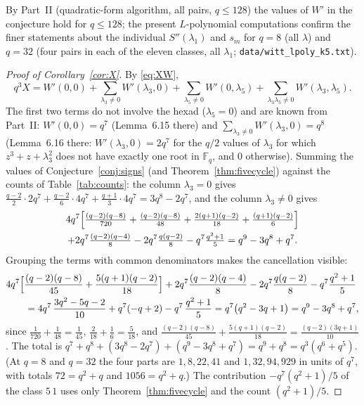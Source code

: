 ﻿\documentclass[12pt,a4paper]{amsart}
\theoremstyle{definition}
\newcommand{\F}{\mathbb{F}}
\newcommand{\Spp}{S''}
\begin{document}
By Part~II (quadratic-form algorithm, all pairs, $q\le128$) the values of $W'$ in the conjecture hold for $q\le128$; the present $L$-polynomial computations confirm the finer statements about the individual $\Spp(\lambda_1)$ and $s_m$ for $q=8$ (all $\lambda$) and $q=32$ (four pairs in each of the eleven classes, all $\lambda_1$; \texttt{data/witt\_lpoly\_k5.txt}).

\begin{proof}[Proof of Corollary~\ref{cor:X}]
By \eqref{eq:XW},
\[
q^3X=W'(0,0)+\sum_{\lambda_3\ne0}W'(\lambda_3,0)+\sum_{\lambda_5\ne0}W'(0,\lambda_5)+\sum_{\lambda_3\lambda_5\ne0}W'(\lambda_3,\lambda_5).
\]
The first two terms do not involve the hexad ($\lambda_5=0$) and are known from Part~II: $W'(0,0)=q^7$ (Lemma~6.15 there) and $\sum_{\lambda_3\ne0}W'(\lambda_3,0)=q^8$ (Lemma~6.16 there: $W'(\lambda_3,0)=2q^7$ for the $q/2$ values of $\lambda_3$ for which $z^3+z+\lambda_3^2$ does not have exactly one root in $\F_q$, and $0$ otherwise). Summing the values of Conjecture~\ref{conj:signs} (and Theorem~\ref{thm:fivecycle}) against the counts of Table~\ref{tab:counts}: the column $\lambda_3=0$ gives $\frac{q-2}2\cdot2q^7+\frac{q-2}6\cdot4q^7+\frac{q+1}3\cdot4q^7=3q^8-2q^7$, and the column $\lambda_3\ne0$ gives
\begin{multline*}
4q^7\Bigl[\tfrac{(q-2)(q-8)}{720}+\tfrac{(q-2)(q-8)}{48}+\tfrac{2(q+1)(q-2)}{18}+\tfrac{(q+1)(q-2)}6\Bigr]\\
+2q^7\tfrac{(q-2)(q-4)}8-2q^7\tfrac{q(q-2)}8-q^7\tfrac{q^2+1}5=q^9-3q^8+q^7 .
\end{multline*}
Grouping the terms with common denominators makes the cancellation visible:
\begin{align*}
&4q^7\Bigl[\frac{(q-2)(q-8)}{45}+\frac{5(q+1)(q-2)}{18}\Bigr]+2q^7\frac{(q-2)(q-4)}8-2q^7\frac{q(q-2)}8-q^7\frac{q^2+1}5\\
&\qquad=4q^7\,\frac{3q^2-5q-2}{10}+q^7(-q+2)-q^7\,\frac{q^2+1}5=q^7\bigl(q^2-3q+1\bigr)=q^9-3q^8+q^7 ,
\end{align*}
since $\frac1{720}+\frac1{48}=\frac1{45}$, $\frac2{18}+\frac16=\frac5{18}$, and $\frac{(q-2)(q-8)}{45}+\frac{5(q+1)(q-2)}{18}=\frac{(q-2)(3q+1)}{10}$. The total is $q^7+q^8+(3q^8-2q^7)+(q^9-3q^8+q^7)=q^9+q^8=q^3(q^6+q^5)$. (At $q=8$ and $q=32$ the four parts are $1,8,22,41$ and $1,32,94,929$ in units of $q^7$, with totals $72=q^2+q$ and $1056=q^2+q$.) The contribution $-q^7(q^2+1)/5$ of the class $5\,1$ uses only Theorem~\ref{thm:fivecycle} and the count $(q^2+1)/5$.
\end{proof}
\end{document}
